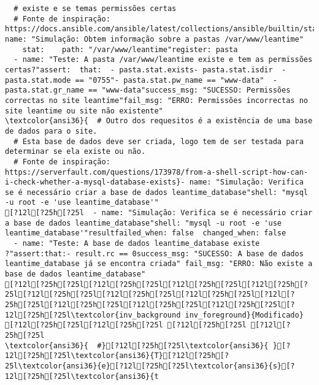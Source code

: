 \documentclass{scrartcl}
\begin{document}
\begin{Verbatim}
  # existe e se temas permissões certas
  # Fonte de inspiração: https://docs.ansible.com/ansible/latest/collections/ansible/builtin/stat_module.html}- name: "Simulação: Obtem informação sobre a pastas /var/www/leantime"
    stat:    path: "/var/www/leantime"register: pasta
  - name: "Teste: A pasta /var/www/leantime existe e tem as permissões certas?"assert:  that:  - pasta.stat.exists- pasta.stat.isdir  - pasta.stat.mode == "0755"- pasta.stat.pw_name == "www-data"  - pasta.stat.gr_name == "www-data"success_msg: "SUCESSO: Permissões correctas no site leantime"fail_msg: "ERRO: Permissões incorrectas no site leantime ou site não existente"
\textcolor{ansi36}{  # Outro dos requesitos é a existência de uma base de dados para o site.
  # Esta base de dados deve ser criada, logo tem de ser testada para determinar se ela existe ou não.
  # Fonte de inspiração: https://serverfault.com/questions/173978/from-a-shell-script-how-can-i-check-whether-a-mysql-database-exists}- name: "Simulação: Verifica se é necessário criar a base de dados leantime_database"shell: "mysql -u root -e 'use leantime_database'"
[?12l[?25h[?25l  - name: "Simulação: Verifica se é necessário criar a base de dados leantime_database"shell: "mysql -u root -e 'use leantime_database'"resultfailed_when: false  changed_when: false
  - name: "Teste: A base de dados leantime_database existe ?"assert:that:- result.rc == 0success_msg: "SUCESSO: A base de dados leantime_database já se encontra criada" fail_msg: "ERRO: Não existe a base de dados leantime_database"
[?12l[?25h[?25l[?12l[?25h[?25l[?12l[?25h[?25l[?12l[?25h[?25l[?12l[?25h[?25l[?12l[?25h[?25l[?12l[?25h[?25l[?12l[?25h[?25l[?12l[?25h[?25l[?12l[?25h[?25l[?12l[?25h[?25l[?12l[?25h[?25l\textcolor{inv_background inv_foreground}{Modificado}
[?12l[?25h[?25l[?12l[?25h[?25l [?12l[?25h[?25l [?12l[?25h[?25l
\textcolor{ansi36}{  #}[?12l[?25h[?25l\textcolor{ansi36}{ }[?12l[?25h[?25l\textcolor{ansi36}{T}[?12l[?25h[?25l\textcolor{ansi36}{e}[?12l[?25h[?25l\textcolor{ansi36}{s}[?12l[?25h[?25l\textcolor{ansi36}{t

\end{Verbatim}
\end{document}
